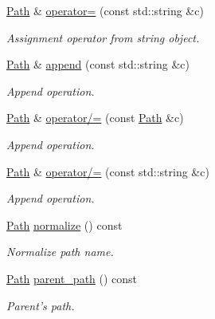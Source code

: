 \begin{DoxyCompactItemize}
\hyperlink{class_d_d4hep_1_1_path}{Path} \& \hyperlink{class_d_d4hep_1_1_path_aa1a61f3b3eab565724525f423fe465e6}{operator=} (const std::string \&c)
\begin{DoxyCompactList}\small\item\em Assignment operator from string object. \item\end{DoxyCompactList}\item 
\hyperlink{class_d_d4hep_1_1_path}{Path} \& \hyperlink{class_d_d4hep_1_1_path_aede85dabc3b61fe22482f3fcf4fd8fad}{append} (const std::string \&c)
\begin{DoxyCompactList}\small\item\em Append operation. \item\end{DoxyCompactList}\item 
\hyperlink{class_d_d4hep_1_1_path}{Path} \& \hyperlink{class_d_d4hep_1_1_path_aeaa34e8637a1d259e32e28691f6baef6}{operator/=} (const \hyperlink{class_d_d4hep_1_1_path}{Path} \&c)
\begin{DoxyCompactList}\small\item\em Append operation. \item\end{DoxyCompactList}\item 
\hyperlink{class_d_d4hep_1_1_path}{Path} \& \hyperlink{class_d_d4hep_1_1_path_a523dd8b394e298b16ec54d602b85a87d}{operator/=} (const std::string \&c)
\begin{DoxyCompactList}\small\item\em Append operation. \item\end{DoxyCompactList}\item 
\hyperlink{class_d_d4hep_1_1_path}{Path} \hyperlink{class_d_d4hep_1_1_path_a3e3d682aa7c70d1c644d67f9e26465e9}{normalize} () const 
\begin{DoxyCompactList}\small\item\em Normalize path name. \item\end{DoxyCompactList}\item 
\hyperlink{class_d_d4hep_1_1_path}{Path} \hyperlink{class_d_d4hep_1_1_path_a0d758ba490f36635b39a7e2e8c6102b2}{parent\_\-path} () const 
\begin{DoxyCompactList}\small\item\em Parent's path. \item\end{DoxyCompactList}\item 

\end{DoxyCompactItemize}
